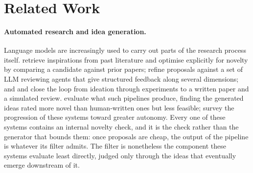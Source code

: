 \section{Related Work}
\label{app:related}

\paragraph{Automated research and idea generation.} Language models are
increasingly used to carry out parts of the research process itself.
\citet{wang2024scimon} retrieve inspirations from past literature and optimise
explicitly for novelty by comparing a candidate against prior papers;
\citet{baek2025researchagent} refine proposals against a set of LLM reviewing
agents that give structured feedback along several dimensions; and
\citet{lu2024aiscientist} and \citet{schmidgall2025agentlab} close the loop
from ideation through experiments to a
written paper and a simulated review. \citet{si2025llmideas} evaluate what such
pipelines produce, finding the generated ideas rated more novel than
human-written ones but less feasible; \citet{zheng2025automation} survey the
progression of these systems toward greater autonomy.
Every one of these systems contains an internal novelty check, and it is the
check rather than the generator that bounds them: once proposals are cheap, the
output of the pipeline is whatever its filter admits. The filter is nonetheless
the component these systems evaluate least directly, judged only through the
ideas that eventually emerge downstream of it.

